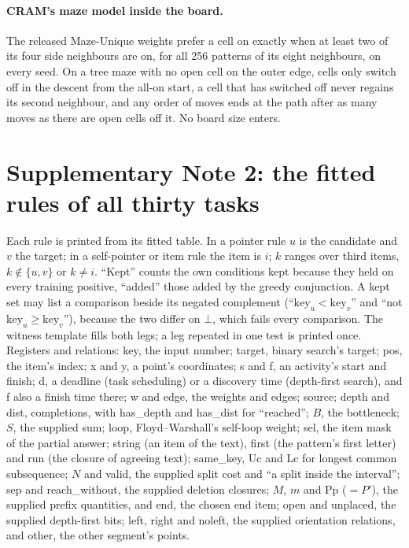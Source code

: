 \documentclass[10pt]{article}
\newcommand{\notyet}{\bot}
\begin{document}
\paragraph{CRAM's maze model inside the board.} The released Maze-Unique weights prefer a cell on exactly when at least
two of its four side neighbours are on, for all 256 patterns of its eight neighbours, on every seed.
On a tree maze with no open cell on the outer edge, cells only switch off in the descent from the all-on start, a cell
that has switched off never regains its second neighbour, and any order of moves ends at the path after as many moves as
there are open cells off it. No board size enters.

\section*{Supplementary Note 2: the fitted rules of all thirty tasks}

Each rule is printed from its fitted table. In a pointer rule $u$ is the candidate and $v$ the target; in a
self-pointer or item rule the item is $i$; $k$ ranges over third items, $k\notin\{u,v\}$ or $k \neq i$. ``Kept'' counts
the own conditions kept because they held on every training positive, ``added'' those added by the greedy conjunction.
A kept set may list a comparison beside its negated complement (``$\mathrm{key}_u<\mathrm{key}_v$'' and ``not
$\mathrm{key}_u\geq\mathrm{key}_v$''), because the two differ on $\notyet$, which fails every comparison. The witness
template fills both legs; a leg repeated in one test is printed once. Registers and relations: key, the input number;
target, binary search's target; pos, the item's index; x and y, a point's coordinates; s and f, an activity's start and
finish; d, a deadline (task scheduling) or a discovery time (depth-first search), and f also a finish time there; w and
edge, the weights and edges; source; depth and dist, completions, with has\_depth and has\_dist for ``reached''; $B$, the
bottleneck; $S$, the supplied sum; loop, Floyd--Warshall's self-loop weight; sel, the item mask of the partial answer;
string (an item of the text), first (the pattern's first letter) and run (the closure of agreeing text); same\_key, Uc
and Lc for longest common subsequence; $N$ and valid, the supplied split cost and ``a split inside the interval''; sep
and reach\_without, the supplied deletion closures; $M$, $m$ and Pp ($=P'$), the supplied prefix quantities, and end,
the chosen end item; open and unplaced, the supplied depth-first bits; left, right and noleft, the supplied orientation
relations, and other, the other segment's points.
\end{document}

